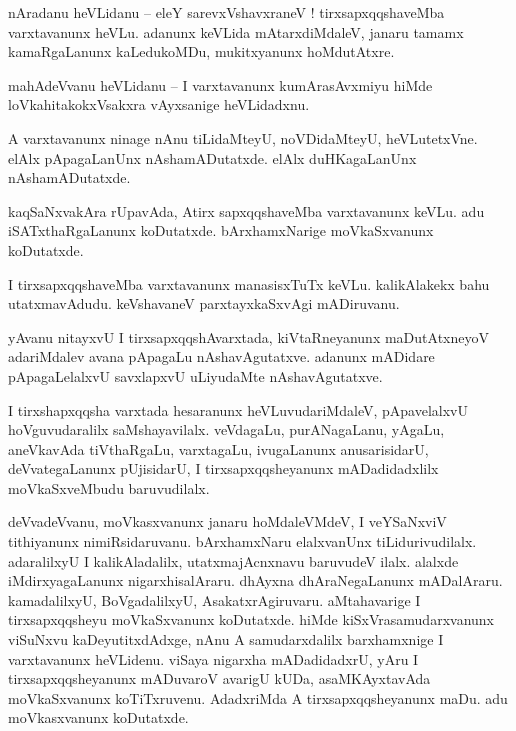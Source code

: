 \documentclass{article}
\begin{document}

\begin{mn}%
nAradanu heVLidanu -- eleY sarevxVshavxraneV ! tirxsapxqqshaveMba varxtavanunx heVLu. adanunx 
keVLida mAtarxdiMdaleV, janaru tamamx kamaRgaLanunx kaLedukoMDu, mukitxyanunx hoMdutAtxre.
\end{mn}

\begin{mn}%
mahAdeVvanu heVLidanu -- I varxtavanunx kumArasAvxmiyu hiMde loVkahitakokxVsakxra vAyxsanige 
heVLidadxnu.
\end{mn}

\begin{mn}%
A varxtavanunx ninage nAnu tiLidaMteyU, noVDidaMteyU, heVLutetxVne. elAlx pApagaLanUnx 
nAshamADutatxde. elAlx duHKagaLanUnx nAshamADutatxde.
\end{mn}

\begin{mn}%
kaqSaNxvakAra rUpavAda, Atirx sapxqqshaveMba varxtavanunx keVLu. adu iSATxthaRgaLanunx koDutatxde. 
bArxhamxNarige moVkaSxvanunx koDutatxde.
\end{mn}

\begin{mn}%
I tirxsapxqqshaveMba varxtavanunx manasisxTuTx keVLu. kalikAlakekx bahu utatxmavAdudu. keVshavaneV 
parxtayxkaSxvAgi mADiruvanu.
\end{mn}

\begin{mn}%
yAvanu nitayxvU I tirxsapxqqshAvarxtada, kiVtaRneyanunx maDutAtxneyoV adariMdalev avana pApagaLu 
nAshavAgutatxve. adanunx mADidare pApagaLelalxvU savxlapxvU uLiyudaMte nAshavAgutatxve.
\end{mn}

\begin{mn}%
I tirxshapxqqsha varxtada hesaranunx heVLuvudariMdaleV, pApavelalxvU hoVguvudaralilx 
saMshayavilalx. veVdagaLu, purANagaLanu, yAgaLu, aneVkavAda tiVthaRgaLu, varxtagaLu, ivugaLanunx 
anusarisidarU, deVvategaLanunx pUjisidarU, I tirxsapxqqsheyanunx mADadidadxlilx moVkaSxveMbudu 
baruvudilalx.
\end{mn}

\begin{mn}%
deVvadeVvanu, moVkasxvanunx janaru hoMdaleVMdeV, I veYSaNxviV tithiyanunx nimiRsidaruvanu. 
bArxhamxNaru elalxvanUnx tiLidurivudilalx. adaralilxyU I kalikAladalilx, utatxmajAcnxnavu 
baruvudeV ilalx. alalxde iMdirxyagaLanunx nigarxhisalAraru. dhAyxna dhAraNegaLanunx mADalAraru. 
kamadalilxyU, BoVgadalilxyU, AsakatxrAgiruvaru. aMtahavarige I tirxsapxqqsheyu moVkaSxvanunx 
koDutatxde. hiMde kiSxVrasamudarxvanunx viSuNxvu kaDeyutitxdAdxge, nAnu A samudarxdalilx 
barxhamxnige I varxtavanunx heVLidenu. viSaya nigarxha mADadidadxrU, yAru I tirxsapxqqsheyanunx 
mADuvaroV avarigU kUDa, asaMKAyxtavAda moVkaSxvanunx koTiTxruvenu. AdadxriMda A 
tirxsapxqqsheyanunx maDu. adu moVkasxvanunx koDutatxde.
\end{mn}
\end{document}
